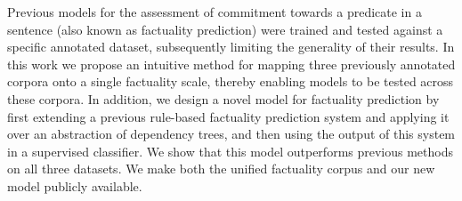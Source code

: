 Previous models for the assessment of commitment towards a predicate in a sentence (also known as factuality prediction) were trained and tested against a specific annotated dataset, subsequently limiting the generality of their results. In this work we propose an intuitive method for mapping three previously annotated corpora onto a single factuality scale, thereby enabling models to be tested across these corpora. In addition, we design a novel model for factuality prediction by first extending a previous rule-based factuality prediction system and applying it over an abstraction of dependency trees, and then using the output of this system in a supervised classifier. We show that this model outperforms previous methods on all three datasets. We make both the unified factuality corpus and our new model publicly available.
